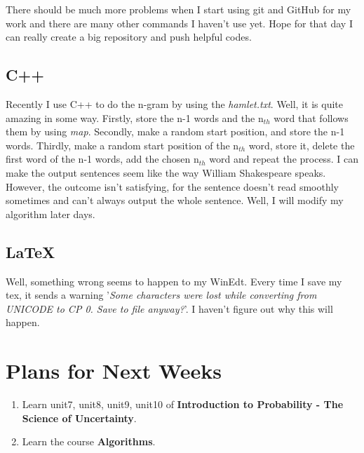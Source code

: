 \documentclass{article}
\begin{document}
There should be much more problems when I start using git and GitHub for my work and there are many other commands I haven't use yet. Hope for that day I can really create a big repository and push helpful codes.
\subsection{C++}

Recently I use C++ to do the n-gram by using the \emph{hamlet.txt}. Well, it is quite amazing in some way. Firstly, store the n-1 words and the n$_{th}$ word that follows them by using \emph{map}. Secondly, make a random start position, and store the n-1 words. Thirdly, make a random start position of the n$_{th}$ word, store it, delete the first word of the n-1 words, add the chosen n$_{th}$ word and repeat the process. I can make the output sentences seem like the way William Shakespeare speaks. However, the outcome isn't satisfying, for the sentence doesn't read smoothly sometimes and can't always output the whole sentence. Well, I will modify my algorithm later days.
\subsection{\LaTeX}

Well, something wrong seems to happen to my WinEdt. Every time I save my tex, it sends a warning '\emph{Some characters were lost while converting from UNICODE to CP 0. Save to file anyway?}'. I haven't figure out why this will happen.
\section{Plans for Next Weeks}
\begin{enumerate}
\item

Learn unit7, unit8, unit9, unit10 of \textbf{Introduction to Probability - The Science of Uncertainty}.
\item

Learn the course \textbf{Algorithms}.
\end{enumerate}
\end{document}
